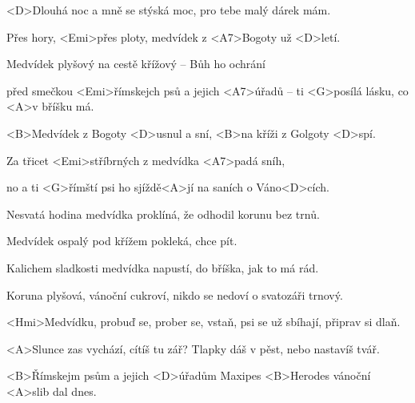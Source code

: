 

\zs
<D>Dlouhá noc a mně se stýská moc,
pro tebe malý dárek mám.

Přes hory, <Emi>přes ploty,
medvídek z <A7>Bogoty už <D>letí.

Medvídek plyšový na cestě
křížový -- Bůh ho ochrání

před smečkou <Emi>římskejch psů
a jejich <A7>úřadů --
ti <G>posílá lásku, co <A>v bříšku má.
\ks


\zr
<B>Medvídek z Bogoty <D>usnul a sní,
<B>na kříži z Golgoty <D>spí.

Za třicet <Emi>stříbrných
z medvídka <A7>padá sníh,

no a ti <G>římští psi
ho sjíždě<A>jí na saních o Váno<D>cích.
\kr

\zs
Nesvatá hodina medvídka proklíná,
že odhodil korunu bez trnů.

Medvídek ospalý pod křížem pokleká,
chce pít.

Kalichem sladkosti medvídka
napustí, do bříška, jak to má rád.

Koruna plyšová, vánoční cukroví,
nikdo se nedoví o svatozáři trnový.
\ks

\zr \kr

\zs
<Hmi>Medvídku, probuď se, prober se, vstaň,
psi se už sbíhají, připrav si dlaň.

<A>Slunce zas vychází, cítíš tu zář?
Tlapky dáš v pěst, nebo nastavíš tvář.

<B>Římskejm psům a jejich <D>úřadům
Maxipes <B>Herodes vánoční <A>slib dal dnes.
\ks

\zr \kr

\kp
